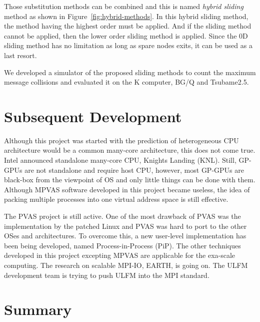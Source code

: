 Those substitution methods can be combined and this is named {\sl
hybrid sliding} method as shown in Figure~\ref{fig:hybrid-methods}. In
this hybrid sliding method, the method having the highest order must
be applied. And if the sliding method cannot be applied, then the
lower order sliding method is applied. Since the 0D sliding method has no
limitation as long as spare nodes exits, it can be used as a last resort.

We developed a simulator of the proposed sliding methods to count the 
maximum message collisions and evaluated it on the K computer, BG/Q
and Tsubame2.5\cite{Hori:2015:SSF:2802658.2802670}. 

\section{Subsequent Development}

Although this project was started with the prediction of
heterogeneous CPU architecture would be a common many-core
architecture, this does not come true. Intel announced standalone
many-core CPU, Knights Landing (KNL). Still, GP-GPUs are not
standalone and require host CPU, however, most GP-GPUs are black-box
from the viewpoint of OS and only little things can be done with
them. Although MPVAS software developed in this project became
useless, the idea of packing multiple processes into one virtual
address space is still effective.

The PVAS project is still active. One of the most drawback of PVAS was
the implementation by the patched Linux and PVAS was hard to port to the
other OSes and architectures. To overcome this, a new
user-level implementation has been being developed, named
Process-in-Process (PiP). 
The other techniques developed in this project excepting MPVAS are
applicable for the exa-scale computing. The research on scalable
MPI-IO, EARTH, is going on. The ULFM development team is
trying to push ULFM into the MPI standard.

\section{Summary}
